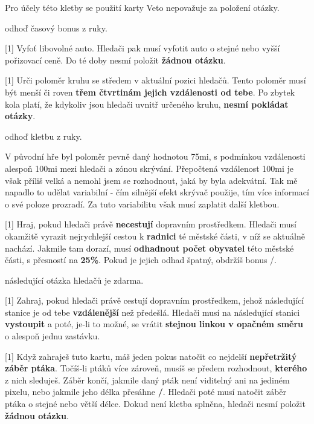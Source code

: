 \begin{cards}
	Pro účely této kletby se použití karty Veto nepovažuje za položení otázky.

	\cost odhoď časový bonus z ruky.

	 Vyfoť libovolné auto. Hledači pak musí vyfotit auto o stejné nebo vyšší pořizovací ceně. Do té doby nesmí položit \textbf{žádnou otázku}.

	 Urči poloměr kruhu se středem v aktuální pozici hledačů. Tento poloměr musí být menší či roven \textbf{třem čtvrtinám jejich vzdálenosti od tebe}. Po zbytek kola platí, že kdykoliv jsou hledači uvnitř určeného kruhu, \textbf{nesmí pokládat otázky}.

	\cost odhoď kletbu z ruky.

	\begin{reasoning}
		V původní hře byl poloměr pevně daný hodnotou 75mi, s podmínkou vzdálenosti alespoň 100mi mezi hledači a zónou skrývání. Přepočtená vzdálenost \dist100mi je však příliš velká a nemohl jsem se rozhodnout, jaká by byla adekvátní. Tak mě napadlo to udělat variabilní - čím silnější efekt skrývač použije, tím více informací o své poloze prozradí. Za tuto variabilitu však musí zaplatit další kletbou.
	\end{reasoning}

	 Hraj, pokud hledači právě \textbf{necestují} dopravním prostředkem. Hledači musí okamžitě vyrazit nejrychlejší cestou k \textbf{radnici} té městské části, v níž se aktuálně nachází. Jakmile tam dorazí, musí \textbf{odhadnout počet obyvatel} této městské části, s přesností na \textbf{25\%}. Pokud je jejich odhad špatný, obdržíš bonus \timecursecensustaker/.

	\cost následující otázka hledačů je zdarma.

	 Zahraj, pokud hledači právě cestují dopravním prostředkem, jehož následující stanice je od tebe \textbf{vzdálenější} než předešlá. Hledači musí na následující stanici \textbf{vystoupit} a poté, je-li to možné, se vrátit \textbf{stejnou linkou v opačném směru} o alespoň jednu zastávku.

	 Když zahraješ tuto kartu, máš jeden pokus natočit co nejdelší \textbf{nepřetržitý záběr ptáka}. Točíš-li ptáků více zároveň, musíš se předem rozhodnout, \textbf{kterého} z nich sleduješ. Záběr končí, jakmile daný pták není viditelný ani na jediném pixelu, nebo jakmile jeho délka přesáhne \textbf{\timecursebirdguide/}. Hledači poté musí natočit záběr ptáka o stejné nebo větší délce. Dokud není kletba splněna, hledači nesmí položit \textbf{žádnou otázku}.


\end{cards}
